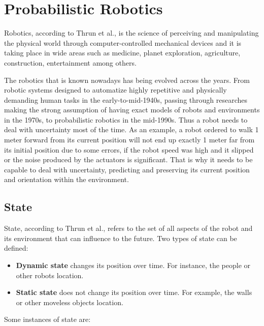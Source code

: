 
\section{Probabilistic Robotics}

Robotics, according to Thrun et al.\cite{Thrun:2005:PR:1121596}, is the science of perceiving and manipulating the physical world through computer-controlled mechanical devices and it is taking place in wide areas such as medicine\cite{Azad:STAR}, planet exploration\cite{Geoffrey:venus}, agriculture\cite{Shamshiri:research-agricultural}, construction\cite{Pileun:construction}, entertainment\cite{Morris:entertainment} among others. 

The robotics that is known nowadays has being evolved across the years. From robotic systems designed to automatize highly repetitive and physically demanding human tasks in the early-to-mid-1940s\cite{Ferreira:prob}, passing through researches making the strong assumption of having exact models of robots and environments in the 1970s, to probabilistic robotics in the mid-1990s\cite{Thrun:robotic-statistics}. Thus a robot needs to deal with uncertainty most of the time. As an example, a robot ordered to walk 1 meter forward from its current position will not end up exactly 1 meter far from its initial position due to some errors, if the robot speed was high and it slipped or the noise produced by the actuators is significant. That is why it needs to be capable to deal with uncertainty, predicting and preserving its current position and orientation within the environment\cite{Nikos:auxiliary-pf}.

\subsection{State}

State, according to Thrun et al.\cite{Thrun:2005:PR:1121596}, refers to the set of all aspects of the robot and its environment that can influence to the future. Two types of state can be defined:

\begin{itemize}
\item \textbf{Dynamic state} changes its position over time. For instance, the people or other robots location.
\item \textbf{Static state} does not change its position over time. For example, the walls or other moveless objects location.
\end{itemize}

Some instances of state are: 

